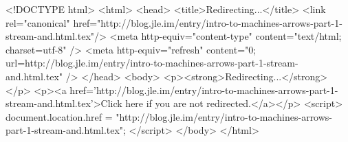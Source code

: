 <!DOCTYPE html>
<html>
<head>
<title>Redirecting...</title>
<link rel="canonical" href="http://blog.jle.im/entry/intro-to-machines-arrows-part-1-stream-and.html.tex"/>
<meta http-equiv="content-type" content="text/html; charset=utf-8" />
<meta http-equiv="refresh" content="0; url=http://blog.jle.im/entry/intro-to-machines-arrows-part-1-stream-and.html.tex" />
</head>
<body>
  <p><strong>Redirecting...</strong></p>
  <p><a href='http://blog.jle.im/entry/intro-to-machines-arrows-part-1-stream-and.html.tex'>Click here if you are not redirected.</a></p>
  <script>
    document.location.href = "http://blog.jle.im/entry/intro-to-machines-arrows-part-1-stream-and.html.tex";
  </script>
</body>
</html>
